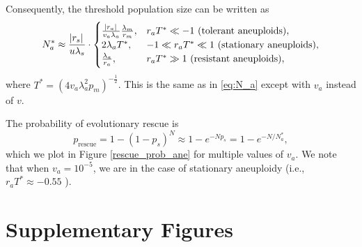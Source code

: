 \documentclass[12pt]{extarticle}
\newcommand{\e}{e}
\newcommand{\presc}{p_\text{rescue}}
\renewcommand{\Delta}{r}
\newcommand{\beginsupplement}{%
      	\setcounter{table}{0}
        \renewcommand{\thetable}{S\arabic{table}}%
        \setcounter{figure}{0}
        \renewcommand{\thefigure}{S\arabic{figure}}%
		\setcounter{equation}{0}
        \renewcommand{\theequation}{A\arabic{equation}}%
}
\begin{document}
\begin{appendices}
Consequently, the threshold population size can be written as
\begin{equation}\label{eq:N_a2}
\begin{aligned}
N_a^* \approx 
  \frac{\abs{\Delta_s}}{u\lambda_s} \cdot \begin{cases}
    \frac{\abs{\Delta_a}}{v_a\lambda_a}  \frac{\lambda_m}{\Delta_m} ,&
  \Delta_a T^* \ll -1 \text{ (tolerant aneuploids)},\\ 
  2\lambda_a T^* ,&
  -1 \ll \Delta_a T^* \ll 1  \text{ (stationary aneuploids)},\\ 
  \frac{\lambda_a}{\Delta_a} ,&
   \Delta_a T^* \gg 1 \text{ (resistant aneuploids)},
  \end{cases}
\end{aligned}
\end{equation}
where $T^*=\left(4v_a\lambda_a^2p_m\right)^{-\frac{1}{2}}$.
This is the same as in \cref{eq:N_a} except with $v_a$ instead of $v$.

The probability of evolutionary rescue is
\begin{equation} \label{eq:rescue_prob_ane} 
\presc = 
1-\left(1-p_s\right)^N \approx
1-\e^{-Np_s} = 
1-e^{-N/N_a^*} ,
\end{equation}
which we plot in Figure \ref{rescue_prob_ane} for multiple values of $v_a$. We note that when $v_a=10^{-5}$, we are in the case of stationary aneuploidy (i.e., $\Delta_a T^*\approx -0.55$ ). 

\newpage
\section*{Supplementary Figures}
\beginsupplement %


\end{appendices}
\end{document}
